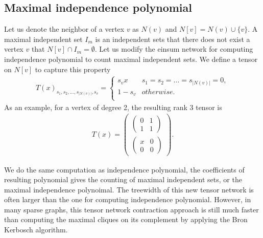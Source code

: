 \documentclass[review,onefignum,onetabnum]{siamart190516}
\newcommand{\<}{\langle}
\renewcommand{\>}{\rangle}
\newcounter{example}
\begin{document}
\subsection{Maximal independence polynomial}
Let us denote the neighbor of a vertex $v$ as $N(v)$ and $N[v] = N(v)\cup \{v\}$.
A maximal independent set $I_m$ is an independent sets that there does not exist a vertex $v$ that $N[v] \cap I_m = \emptyset$.
Let us modify the einsum network for computing independence polynomial to count maximal independent sets.
We define a tensor on $N[v]$ to capture this property
\begin{align}
    T(x)_{s_1,s_2,\ldots,s_{|N(v)|},s_v} = \begin{cases}
        s_vx & s_1=s_2=\ldots=s_{|N(v)|}=0,\\
        1-s_v& otherwise.\\
    \end{cases}
\end{align}
As an example, for a vertex of degree 2, the resulting rank 3 tensor is
\begin{align}
    T(x)=\left(\begin{matrix}
    \left(\begin{matrix}
        0 &1 \\
        1 &1
    \end{matrix}\right)\\
    \left(\begin{matrix}
        x &0 \\
        0 &0
    \end{matrix}\right)
    \end{matrix}\right).
\end{align}

We do the same computation as independence polynomial, the coefficients of resulting polynomial gives the counting of maximal independent sets, or the maximal independence polynoimal.
The treewidth of this new tensor network is often larger than the one for computing independence polynomial.
However, in many sparse graphs, this tensor network contraction approach is still much faster than computing the maximal cliques on its complement by applying the Bron Kerbosch algorithm.
\end{document}
